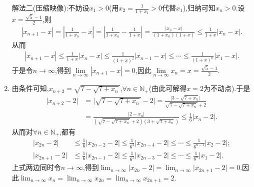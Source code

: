 \documentclass[../../main.tex]{subfiles}
\begin{document}
\begin{solution}
\begin{enumerate}
{\color{blue}解法二(压缩映像):}不妨设$x_1>0$(用$x_2=\frac{1}{1+x_1}>0$代替$x_1$),归纳可知$x_n>0$.设$x=\frac{\sqrt{5}-1}{2}$,则
\begin{align*}
\left| x_{n+1}-x \right|=\left| \frac{1}{1+x_n}-x \right|=\left| \frac{1}{1+x_n}-\frac{1}{1+x} \right|=\frac{\left| x_n-x \right|}{\left( 1+x_n \right) \left( 1+x \right)}\leqslant \frac{1}{1+x}\left| x_n-x \right|.
\end{align*}
从而
\begin{align*}
\left| x_{n+1}-x \right|\leqslant \frac{1}{1+x}\left| x_n-x \right|\leqslant \frac{1}{\left( 1+x \right) ^2}\left| x_{n-1}-x \right|\leqslant \cdots \leqslant \frac{1}{\left( 1+x \right) ^n}\left| x_1-x \right|.
\end{align*}
于是令$n\to\infty$,得到$\underset{n\rightarrow \infty}{\lim}\left| x_{n+1}-x \right|=0$,因此$\underset{n\rightarrow \infty}{\lim}x_n=x=\frac{\sqrt{5}-1}{2}$.

\item 由条件可知,\(x_{n + 2}=\sqrt{7-\sqrt{7 + x_n}}\),\(\forall n\in\mathbb{N}_+\)(由此可解得\(x = 2\)为不动点).于是
\begin{align*}
\vert x_{n + 2}-2\vert&=\vert\sqrt{7-\sqrt{7 + x_n}}-2\vert
=\frac{\vert 3-\sqrt{7 + x_n}\vert}{\sqrt{7-\sqrt{7 + x_n}}+2}\\
&=\frac{\vert 2 - x_n\vert}{(\sqrt{7-\sqrt{7 + x_n}}+2)(3+\sqrt{7 + x_n})}
\leqslant\frac{1}{6}\vert x_n - 2\vert.
\end{align*}
从而对$\forall n \in \mathbb{N}_+$,都有
\begin{align*}
\vert x_{2n}-2\vert&\leqslant\frac{1}{6}\vert x_{2n - 2}-2\vert\leqslant\frac{1}{6^2}\vert x_{2n - 4}-2\vert\leqslant\cdots\leqslant\frac{1}{6^{n - 1}}\vert x_2 - 2\vert;\\
\vert x_{2n + 1}-2\vert&\leqslant\frac{1}{6}\vert x_{2n - 1}-2\vert\leqslant\frac{1}{6^2}\vert x_{2n - 3}-2\vert\leqslant\cdots\leqslant\frac{1}{6^n}\vert x_1 - 2\vert.
\end{align*}
上式两边同时令\(n\rightarrow\infty\),得到\(\lim_{n\rightarrow\infty}\vert x_{2n}-2\vert=\lim_{n\rightarrow\infty}\vert x_{2n + 1}-2\vert = 0\).因此\(\lim_{n\rightarrow\infty}x_n=\lim_{n\rightarrow\infty}x_{2n}=\lim_{n\rightarrow\infty}x_{2n + 1}=2\).
\end{enumerate}
\end{solution}
\end{document}
